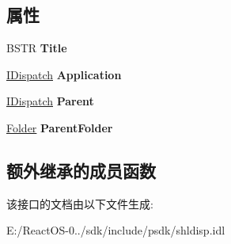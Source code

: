 \subsection*{属性}
\begin{DoxyCompactItemize}
\item 
\mbox{\label{interface_shell32_1_1_folder_a40f6ac1ad47cf22f11bd2718e9102719}} 
B\+S\+TR {\bfseries Title}
\item 
\mbox{\label{interface_shell32_1_1_folder_a9545dcf5814d2c01b7b769efe1a6c890}} 
\hyperlink{interface_i_dispatch}{I\+Dispatch} {\bfseries Application}
\item 
\mbox{\label{interface_shell32_1_1_folder_af19460bbef8815eb8698c80aae222679}} 
\hyperlink{interface_i_dispatch}{I\+Dispatch} {\bfseries Parent}
\item 
\mbox{\label{interface_shell32_1_1_folder_acd467c78365b185106ea6336dc7eada3}} 
\hyperlink{interface_shell32_1_1_folder}{Folder} {\bfseries Parent\+Folder}
\end{DoxyCompactItemize}
\subsection*{额外继承的成员函数}


该接口的文档由以下文件生成\+:\begin{DoxyCompactItemize}
\item 
E\+:/\+React\+O\+S-\/0../sdk/include/psdk/shldisp.\+idl\end{DoxyCompactItemize}
